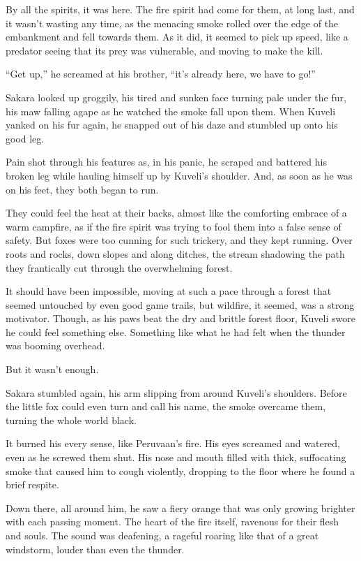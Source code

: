 By all the spirits, it was here. The fire spirit had come for them, at long last, and it wasn't wasting any time, as the menacing smoke rolled over the edge of the embankment and fell towards them. As it did, it seemed to pick up speed, like a predator seeing that its prey was vulnerable, and moving to make the kill.

``Get up,'' he screamed at his brother, ``it's already here, we have to go!''

Sakara looked up groggily, his tired and sunken face turning pale under the fur, his maw falling agape as he watched the smoke fall upon them. When Kuveli yanked on his fur again, he snapped out of his daze and stumbled up onto his good leg.

Pain shot through his features as, in his panic, he scraped and battered his broken leg while hauling himself up by Kuveli's shoulder. And, as soon as he was on his feet, they both began to run.

They could feel the heat at their backs, almost like the comforting embrace of a warm campfire, as if the fire spirit was trying to fool them into a false sense of safety. But foxes were too cunning for such trickery, and they kept running. Over roots and rocks, down slopes and along ditches, the stream shadowing the path they frantically cut through the overwhelming forest.

It should have been impossible, moving at such a pace through a forest that seemed untouched by even good game trails, but wildfire, it seemed, was a strong motivator. Though, as his paws beat the dry and brittle forest floor, Kuveli swore he could feel something else. Something like what he had felt when the thunder was booming overhead.

But it wasn't enough.

Sakara stumbled again, his arm slipping from around Kuveli's shoulders. Before the little fox could even turn and call his name, the smoke overcame them, turning the whole world black.

It burned his every sense, like Peruvaan's fire. His eyes screamed and watered, even as he screwed them shut. His nose and mouth filled with thick, suffocating smoke that caused him to cough violently, dropping to the floor where he found a brief respite.

Down there, all around him, he saw a fiery orange that was only growing brighter with each passing moment. The heart of the fire itself, ravenous for their flesh and souls. The sound was deafening, a rageful roaring like that of a great windstorm, louder than even the thunder.

